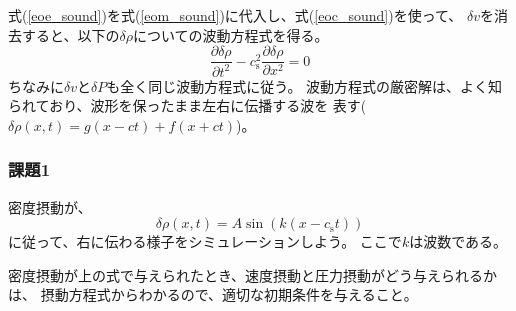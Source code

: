 式(\ref{eoe_sound})を式(\ref{eom_sound})に代入し、式(\ref{eoc_sound})を使って、
$\delta v$を消去すると、以下の$\delta \rho$についての波動方程式を得る。
\begin{equation}
    \frac{\partial \delta \rho}{\partial t^2} - c_\mathrm{s}^2 \frac{\partial \delta \rho}{\partial x^2}=0
\end{equation}
ちなみに$\delta v$と$\delta P$も全く同じ波動方程式に従う。
波動方程式の厳密解は、よく知られており、波形を保ったまま左右に伝播する波を
表す($\delta \rho(x,t) = g(x-ct) + f(x+ct)$)。

\subsubsection{課題1}

密度摂動が、
\begin{equation}
    \delta \rho(x,t) = A \sin ( k(x - c_\mathrm{s}t))
\end{equation}
に従って、右に伝わる様子をシミュレーションしよう。
ここで$k$は波数である。

密度摂動が上の式で与えられたとき、速度摂動と圧力摂動がどう与えられるかは、
摂動方程式からわかるので、適切な初期条件を与えること。







